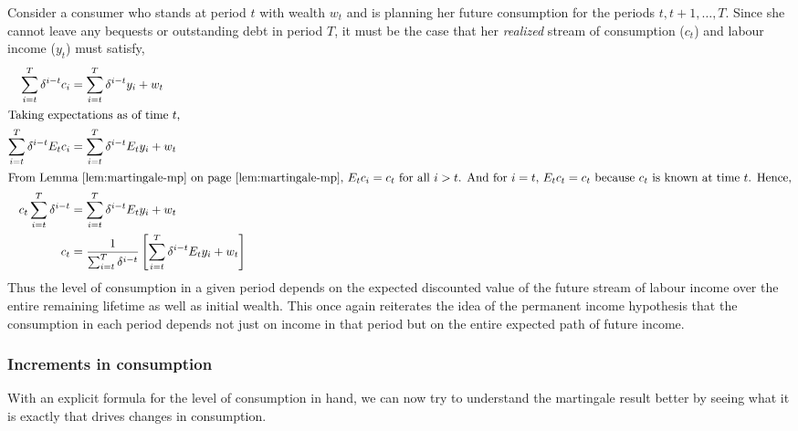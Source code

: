 \documentclass[12pt,reqno]{amsart}
\begin{document}
Consider a consumer who stands at period $t$ with wealth $w_t$ and is
planning her future consumption for the periods
$t,t+1,\ldots,T$. Since she cannot leave any bequests or outstanding
debt in period $T$, it must be the case that  her \emph{realized}
stream of consumption ($c_t$) and labour income ($y_t$) must satisfy,
\begin{align}
\sum_{i=t}^T \delta^{i-t} c_i &= \sum_{i=t}^T \delta^{i-t} y_i +
w_t\\
\intertext{Taking expectations as of time $t$,}
\sum_{i=t}^T \delta^{i-t} E_t c_i &= \sum_{i=t}^T \delta^{i-t} E_t y_i +
w_t\\
\intertext{From Lemma~\ref{lem:martingale-mp} on
  page~\pageref{lem:martingale-mp}, $E_tc_i=c_t$ for all
$i>t$. And for $i=t$, $E_tc_t=c_t$ because $c_t$ is known at time
$t$. Hence,}
c_t\sum_{i=t}^T \delta^{i-t}  &= \sum_{i=t}^T \delta^{i-t} E_t y_i +
w_t\label{eq:level-c-pih}\\
c_t&=\frac{1}{\sum_{i=t}^T \delta^{i-t} }\left[ \sum_{i=t}^T \delta^{i-t} E_t y_i +
w_t\right]
\end{align}
Thus the level of consumption in a given period depends on the
expected discounted value of the future stream of labour income over
the entire remaining lifetime as well as initial wealth. This once
again reiterates the idea of the permanent income hypothesis that the
consumption in each period depends not just on income in that period
but on the entire expected path of future income.
\subsubsection{Increments in consumption}
With an explicit formula for the level of consumption in hand, we can
now try to understand the martingale result better by seeing what it
is exactly that drives changes in consumption.
\end{document}
